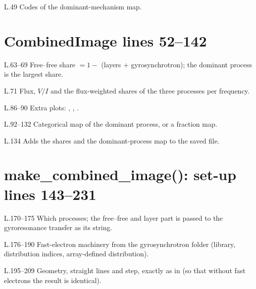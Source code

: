 \begin{lines}
\item[L.49] Codes of the dominant-mechanism map.
\end{lines}
\section*{\normalsize CombinedImage \hfill{\small\mdseries\color{gray}lines 52--142}}

\begin{lines}
\item[L.63–69] Free--free share $=1-$ (layers + gyrosynchrotron); the dominant process is the largest share.
\item[L.71] Flux, $V/I$ and the flux-weighted shares of the three processes per frequency.
\item[L.86–90] Extra plots: , , .
\item[L.92–132] Categorical map of the dominant process, or a fraction map.
\item[L.134] Adds the shares and the dominant-process map to the saved file.
\end{lines}
\section*{\normalsize make\_combined\_image(): set-up \hfill{\small\mdseries\color{gray}lines 143--231}}

\begin{lines}
\item[L.170–175] Which processes; the free--free and layer part is passed to the gyroresonance transfer as its  string.
\item[L.176–190] Fast-electron machinery from the gyrosynchrotron folder (library, distribution indices, array-defined distribution).
\item[L.195–209] Geometry, straight lines and step, exactly as in  (so that without fast electrons the result is identical).
\end{lines}
